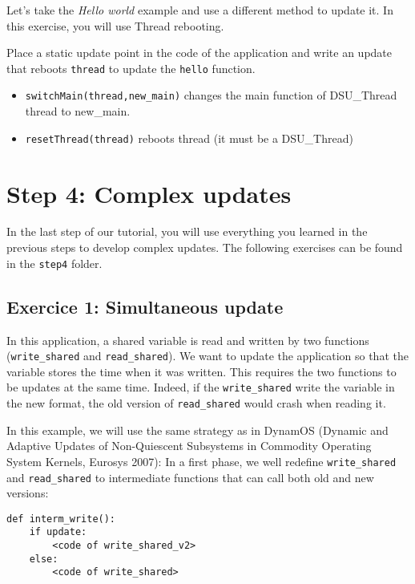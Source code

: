 \documentclass{article}
\begin{document}
Let's take the \textit{Hello world} example and use a different method
to update it. In this exercise, you will use Thread rebooting.

Place a static update point in the code of the application and write
an update that reboots \texttt{thread} to update the \texttt{hello}
function.
 
\begin{itemize}
\item \texttt{switchMain(thread,new\_main)} changes the main function of DSU\_Thread thread to new\_main.
\item \texttt{resetThread(thread)} reboots thread (it must be a DSU\_Thread)  

\end{itemize}


\section{Step 4: Complex updates}

In the last step of our tutorial, you will use everything you learned
in the previous steps to develop complex updates. The
following exercises can be found in the \texttt{step4} folder.

\subsection{Exercice 1: Simultaneous update}

In this application, a shared variable is read and written by two
functions (\texttt{write\_shared} and \texttt{read\_shared}). We want
to update the application so that the variable stores the time when it
was written. This requires the two functions to be updates at the same
time. Indeed, if the \texttt{write\_shared} write the variable in the
new format, the old version of \texttt{read\_shared} would crash when
reading it.

In this example, we will use the same strategy as in DynamOS (Dynamic
and Adaptive Updates of Non-Quiescent Subsystems in Commodity
Operating System Kernels, Eurosys 2007): In a first phase, we well
redefine \texttt{write\_shared} and \texttt{read\_shared} to
intermediate functions that can call both old and new versions:

\begin{verbatim}
def interm_write():
    if update:
        <code of write_shared_v2>
    else:
        <code of write_shared>
\end{verbatim}
 
\end{document}
